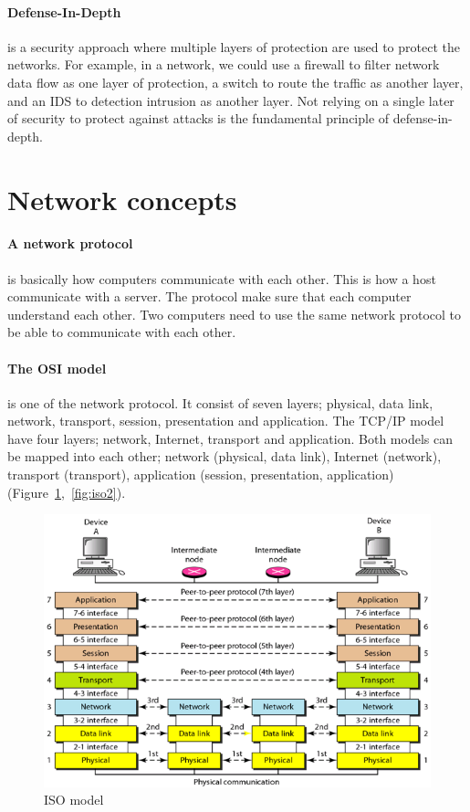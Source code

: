 \documentclass[7x9]{times}
\begin{document}
\paragraph{Defense-In-Depth} is a security approach where
multiple layers of protection are used to protect the
networks. For example, in a network, we could use a firewall
to filter network data flow as one layer of protection, a
switch to route the traffic as another layer, and an IDS to
detection intrusion as another layer. Not relying on a
single later of security to protect against attacks is the
fundamental principle of defense-in-depth.
 


\section{Network concepts}

\paragraph{A network protocol} is basically how computers 
communicate with each other. This is how a host 
communicate with a server. The protocol make sure that each 
computer understand each other. Two computers need to use 
the same network protocol to be able to communicate with 
each other.

\paragraph{The OSI model} is one of the network protocol.
It consist of seven layers; physical, data link, network,
transport, session, presentation and application. The TCP/IP
model have four layers; network, Internet, transport and
application. Both models can be mapped into each other;
network (physical, data link), Internet (network), 
transport (transport), application (session, presentation, 
application)(Figure~\ref{fig:iso1},~\ref{fig:iso2}). 

\begin{figure}
    \includegraphics[]{GOySTAD}
    \caption{ISO model}
    \label{fig:iso1}
\end{figure}
\end{document}
